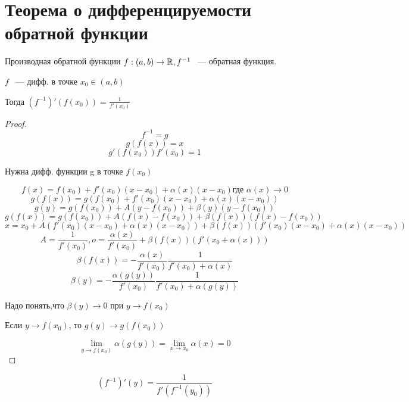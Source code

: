 ﻿\section{Теорема о дифференцируемости обратной функции}


\begin{theorem}{Производная обратной функции}
$f: (a, b) \to \mathbb{R},f^{-1}$ ~--- обратная функция.

$f$ ~--- дифф. в точке $x_0 \in (a, b)$

Тогда $(f^{-1})'(f(x_0)) = \frac{1}{f'(x_0)}$

\end{theorem}

\begin{proof}

$$f^{-1} = g$$
$$g(f(x)) = x$$
$$g'(f(x_0))f'(x_0) = 1$$

Нужна дифф. функции g в точке $f(x_0)$

$$f(x) = f(x_0) + f'(x_0)(x - x_0) + \alpha (x)(x - x_0) \text{где $\alpha(x) \to 0$}$$
$$g(f(x)) = g(f(x_0) + f'(x_0)(x - x_0) + \alpha (x)(x - x_0))$$
$$g(y) = g(f(x_0)) + A(y - f(x_0)) + \beta(y)(y - f(x_0))$$
$$g(f(x)) = g(f(x_0)) + A(f(x) - f(x_0)) + \beta(f(x))(f(x) - f(x_0))$$
$$x = x_0 + A(f'(x_0)(x - x_0) + \alpha(x)(x - x_0)) + \beta(f(x))(f'(x_0)(x - x_0) + \alpha(x)(x - x_0))$$
$$A = \frac{1}{f'(x_0)}, o = \frac{\alpha(x)}{f'(x_0)} + \beta(f(x))(f'(x_0 + \alpha(x)))$$
$$\beta(f(x)) = -\frac{\alpha(x)}{f'(x_0)}\frac{1}{f'(x_0) + \alpha(x)}$$
$$\beta(y) = -\frac{\alpha(g(y))}{f'(x_0)}\frac{1}{f'(x_0) + \alpha(g(y))}$$

Надо понять,что $\beta(y) \to 0$ при $y \to f(x_0)$

Если $y \to f(x_0)$, то $g(y) \to g(f(x_0))$

$$\lim_{y \to f(x_0)}\alpha(g(y)) = \lim_{x \to x_0}\alpha(x) = 0$$
\end{proof}

\begin{conseq}
$$(f^{-1})'(y) = \frac{1}{f'(f^{-1}(y_0))}$$

\end{conseq}